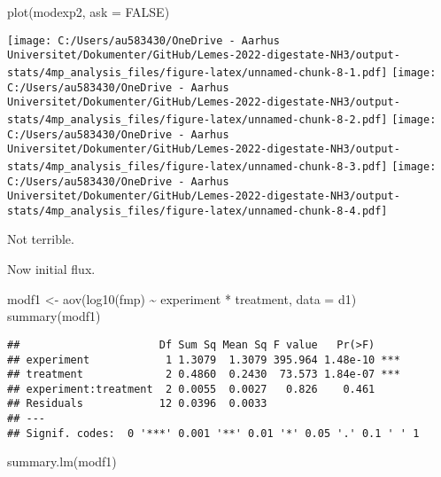 \documentclass[
]{article}
\newenvironment{Shaded}{\begin{snugshade}}{\end{snugshade}}
\newcommand{\AttributeTok}[1]{\textcolor[rgb]{0.77,0.63,0.00}{#1}}
\newcommand{\ConstantTok}[1]{\textcolor[rgb]{0.00,0.00,0.00}{#1}}
\newcommand{\FunctionTok}[1]{\textcolor[rgb]{0.00,0.00,0.00}{#1}}
\newcommand{\NormalTok}[1]{#1}
\newcommand{\OtherTok}[1]{\textcolor[rgb]{0.56,0.35,0.01}{#1}}
\newcommand{\SpecialCharTok}[1]{\textcolor[rgb]{0.00,0.00,0.00}{#1}}
\begin{document}
\begin{Shaded}
\begin{Highlighting}[]
\FunctionTok{plot}\NormalTok{(modexp2, }\AttributeTok{ask =} \ConstantTok{FALSE}\NormalTok{)}
\end{Highlighting}
\end{Shaded}

\texttt{[image: C:/Users/au583430/OneDrive - Aarhus Universitet/Dokumenter/GitHub/Lemes-2022-digestate-NH3/output-stats/4mp\_analysis\_files/figure-latex/unnamed-chunk-8-1.pdf]}
\texttt{[image: C:/Users/au583430/OneDrive - Aarhus Universitet/Dokumenter/GitHub/Lemes-2022-digestate-NH3/output-stats/4mp\_analysis\_files/figure-latex/unnamed-chunk-8-2.pdf]}
\texttt{[image: C:/Users/au583430/OneDrive - Aarhus Universitet/Dokumenter/GitHub/Lemes-2022-digestate-NH3/output-stats/4mp\_analysis\_files/figure-latex/unnamed-chunk-8-3.pdf]}
\texttt{[image: C:/Users/au583430/OneDrive - Aarhus Universitet/Dokumenter/GitHub/Lemes-2022-digestate-NH3/output-stats/4mp\_analysis\_files/figure-latex/unnamed-chunk-8-4.pdf]}

Not terrible.

Now initial flux.

\begin{Shaded}
\begin{Highlighting}[]
\NormalTok{modf1 }\OtherTok{\textless{}{-}} \FunctionTok{aov}\NormalTok{(}\FunctionTok{log10}\NormalTok{(fmp) }\SpecialCharTok{\textasciitilde{}}\NormalTok{ experiment }\SpecialCharTok{*}\NormalTok{ treatment, }\AttributeTok{data =}\NormalTok{ d1)}
\FunctionTok{summary}\NormalTok{(modf1)}
\end{Highlighting}
\end{Shaded}

\begin{verbatim}
##                      Df Sum Sq Mean Sq F value   Pr(>F)    
## experiment            1 1.3079  1.3079 395.964 1.48e-10 ***
## treatment             2 0.4860  0.2430  73.573 1.84e-07 ***
## experiment:treatment  2 0.0055  0.0027   0.826    0.461    
## Residuals            12 0.0396  0.0033                     
## ---
## Signif. codes:  0 '***' 0.001 '**' 0.01 '*' 0.05 '.' 0.1 ' ' 1
\end{verbatim}

\begin{Shaded}
\begin{Highlighting}[]
\FunctionTok{summary.lm}\NormalTok{(modf1)}
\end{Highlighting}
\end{Shaded}
\end{document}
